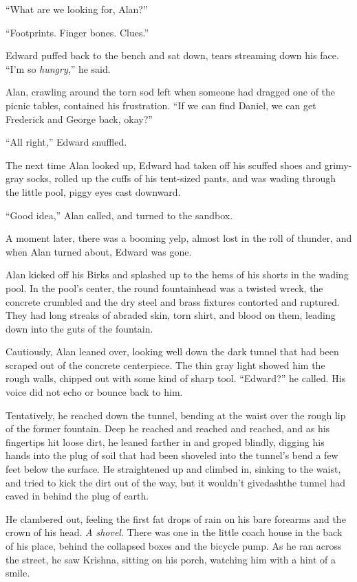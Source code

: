 ``What are we looking for, Alan?''

``Footprints.  Finger bones.  Clues.''

Edward puffed back to the bench and sat down, tears streaming down his
face.  ``I'm so \textit{hungry},'' he said.

Alan, crawling around the torn sod left when someone had dragged one
of the picnic tables, contained his frustration.  ``If we can find
Daniel, we can get Frederick and George back, okay?''

``All right,'' Edward snuffled.

The next time Alan looked up, Edward had taken off his scuffed shoes
and grimy-gray socks, rolled up the cuffs of his tent-sized pants, and
was wading through the little pool, piggy eyes cast downward.

``Good idea,'' Alan called, and turned to the sandbox.

A moment later, there was a booming yelp, almost lost in the roll of
thunder, and when Alan turned about, Edward was gone.

Alan kicked off his Birks and splashed up to the hems of his shorts in
the wading pool.  In the pool's center, the round fountainhead was a
twisted wreck, the concrete crumbled and the dry steel and brass
fixtures contorted and ruptured.  They had long streaks of abraded
skin, torn shirt, and blood on them, leading down into the guts of the
fountain.

Cautiously, Alan leaned over, looking well down the dark tunnel that
had been scraped out of the concrete centerpiece.  The thin gray light
showed him the rough walls, chipped out with some kind of sharp tool. 
``Edward?'' he called.  His voice did not echo or bounce back to him.

Tentatively, he reached down the tunnel, bending at the waist over the
rough lip of the former fountain.  Deep he reached and reached and
reached, and as his fingertips hit loose dirt, he leaned farther in
and groped blindly, digging his hands into the plug of soil that had
been shoveled into the tunnel's bend a few feet below the surface.  He
straightened up and climbed in, sinking to the waist, and tried to
kick the dirt out of the way, but it wouldn't givedash{}the tunnel had
caved in behind the plug of earth.

He clambered out, feeling the first fat drops of rain on his bare
forearms and the crown of his head.  \textit{A shovel}.  There was one
in the little coach house in the back of his place, behind the
collapsed boxes and the bicycle pump.  As he ran across the street, he
saw Krishna, sitting on his porch, watching him with a hint of a
smile.

